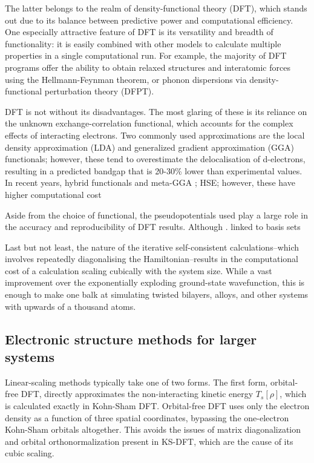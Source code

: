 \documentclass[11pt,a4paper,twoside]{report}  %
\numberwithin{equation}{section}					%
\numberwithin{figure}{section}						%
\begin{document}
The latter belongs to the realm of density-functional theory (DFT), which stands out due to its balance between predictive power and computational efficiency\autocite{marzariElectronicstructureMethodsMaterials2021}. One especially attractive feature of DFT is its versatility and breadth of functionality: it is easily combined with other models to calculate multiple properties in a single computational run. For example, the majority of DFT programs offer the ability to obtain relaxed structures and interatomic forces using the Hellmann-Feynman theorem, or phonon dispersions via density-functional perturbation theory (DFPT). 

DFT is not without its disadvantages. The most glaring of these is its reliance on the unknown exchange-correlation functional, which accounts for the complex effects of interacting electrons. Two commonly used approximations are the local density approximation (LDA) and generalized gradient approximation (GGA) functionals; however, these tend to overestimate the delocalisation of d-electrons, resulting in a predicted bandgap that is 20-30\% lower than experimental values. In recent years, hybrid functionals and meta-GGA ; HSE; however, these have higher computational cost

Aside from the choice of functional, the pseudopotentials used play a large role in the accuracy and reproducibility of DFT results. Although . linked to basis sets

Last but not least, the nature of the iterative self-consistent calculations--which involves repeatedly diagonalising the Hamiltonian--results in the computational cost of a calculation scaling cubically with the system size. While a vast improvement over the exponentially exploding ground-state wavefunction, this is enough to make one balk at simulating twisted bilayers, alloys, and other systems with upwards of a thousand atoms.


\subsection{Electronic structure methods for larger systems}

Linear-scaling methods typically take one of two forms. The first form, orbital-free DFT, 
directly approximates the non-interacting kinetic energy $T_s[\rho]$, which is calculated exactly in Kohn-Sham DFT\autocite{wangOrbitalFreeKineticEnergyDensity2002}. Orbital-free DFT uses only the electron density as a function of three spatial coordinates, bypassing the one-electron Kohn-Sham orbitals altogether. This avoids the issues of matrix diagonalization and orbital orthonormalization present in KS-DFT, which are the cause of its cubic scaling. 
\end{document}
